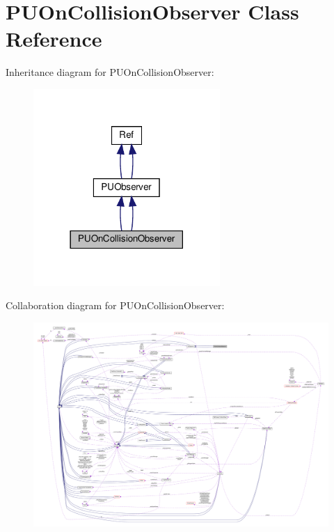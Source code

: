 \hypertarget{classPUOnCollisionObserver}{}\section{P\+U\+On\+Collision\+Observer Class Reference}
\label{classPUOnCollisionObserver}


Inheritance diagram for P\+U\+On\+Collision\+Observer\+:
\nopagebreak
\begin{figure}[H]
\begin{center}
\leavevmode
\includegraphics[width=201pt]{classPUOnCollisionObserver__inherit__graph}
\end{center}
\end{figure}


Collaboration diagram for P\+U\+On\+Collision\+Observer\+:
\nopagebreak
\begin{figure}[H]
\begin{center}
\leavevmode
\includegraphics[width=350pt]{classPUOnCollisionObserver__coll__graph}
\end{center}
\end{figure}
